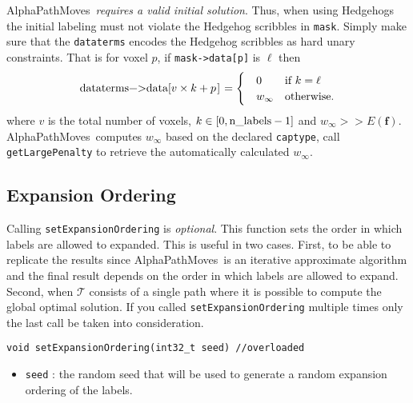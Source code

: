 \documentclass[12pt,letterpaper]{article}
\def\APM{{\ttfamily AlphaPathMoves}~}
\def\Tree{\mathcal{T}}
\def\labelvars{\mathbf{f}}
\def\Tree{\mathcal{T}}
\begin{document}
\begin{tcolorbox}
\APM {\em requires a valid initial solution}. Thus, when using Hedgehogs the initial labeling must not violate the Hedgehog scribbles in \lstinline{mask}. Simply make sure that the \lstinline{dataterms} encodes the  Hedgehog scribbles as hard unary constraints. That is for voxel $p$,
if \lstinline{mask->data[p]} is $\ell$ then
\begin{equation*}
     \text{\lstinline{dataterms->data[}} v \times k+ p \text{\lstinline{]}}=
     \begin{cases}
        \quad 0 & \mbox{if } k = \ell \\
       \quad  w_\infty  & \mbox{otherwise.}
     \end{cases}
\end{equation*}
where $v$ is the total number of voxels, $k \in [0,\text{\lstinline{n_labels}}-1]$ and $w_\infty >> E(\labelvars)$. \APM computes $w_\infty$ based on the declared \lstinline{captype}, call \lstinline{getLargePenalty} to retrieve the automatically calculated $w_\infty$.
\end{tcolorbox}
\subsection{Expansion Ordering}
Calling \lstinline{setExpansionOrdering} is {\em optional}. This function sets the order in which labels are allowed to expanded.  This is useful in two cases. First, to be able to replicate the results since \APM is an iterative approximate algorithm and the final result depends on the order in which labels are allowed to expand. Second, when $\Tree$ consists of a single path where it is possible to compute the global optimal solution. If you called \lstinline{setExpansionOrdering} multiple times only the last call be taken into consideration.

\begin{lstlisting}
void setExpansionOrdering(int32_t seed) //overloaded
\end{lstlisting}
\begin{itemize}
\item \lstinline{seed} : the random seed that will be used to generate a random expansion ordering of the labels.
\end{itemize}
\end{document}
